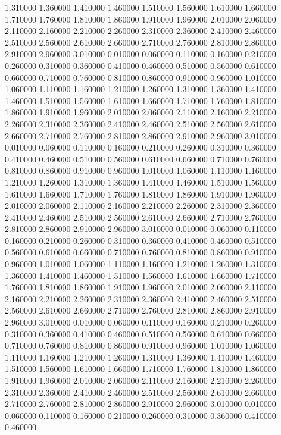 1.310000
1.360000
1.410000
1.460000
1.510000
1.560000
1.610000
1.660000
1.710000
1.760000
1.810000
1.860000
1.910000
1.960000
2.010000
2.060000
2.110000
2.160000
2.210000
2.260000
2.310000
2.360000
2.410000
2.460000
2.510000
2.560000
2.610000
2.660000
2.710000
2.760000
2.810000
2.860000
2.910000
2.960000
3.010000
0.010000
0.060000
0.110000
0.160000
0.210000
0.260000
0.310000
0.360000
0.410000
0.460000
0.510000
0.560000
0.610000
0.660000
0.710000
0.760000
0.810000
0.860000
0.910000
0.960000
1.010000
1.060000
1.110000
1.160000
1.210000
1.260000
1.310000
1.360000
1.410000
1.460000
1.510000
1.560000
1.610000
1.660000
1.710000
1.760000
1.810000
1.860000
1.910000
1.960000
2.010000
2.060000
2.110000
2.160000
2.210000
2.260000
2.310000
2.360000
2.410000
2.460000
2.510000
2.560000
2.610000
2.660000
2.710000
2.760000
2.810000
2.860000
2.910000
2.960000
3.010000
0.010000
0.060000
0.110000
0.160000
0.210000
0.260000
0.310000
0.360000
0.410000
0.460000
0.510000
0.560000
0.610000
0.660000
0.710000
0.760000
0.810000
0.860000
0.910000
0.960000
1.010000
1.060000
1.110000
1.160000
1.210000
1.260000
1.310000
1.360000
1.410000
1.460000
1.510000
1.560000
1.610000
1.660000
1.710000
1.760000
1.810000
1.860000
1.910000
1.960000
2.010000
2.060000
2.110000
2.160000
2.210000
2.260000
2.310000
2.360000
2.410000
2.460000
2.510000
2.560000
2.610000
2.660000
2.710000
2.760000
2.810000
2.860000
2.910000
2.960000
3.010000
0.010000
0.060000
0.110000
0.160000
0.210000
0.260000
0.310000
0.360000
0.410000
0.460000
0.510000
0.560000
0.610000
0.660000
0.710000
0.760000
0.810000
0.860000
0.910000
0.960000
1.010000
1.060000
1.110000
1.160000
1.210000
1.260000
1.310000
1.360000
1.410000
1.460000
1.510000
1.560000
1.610000
1.660000
1.710000
1.760000
1.810000
1.860000
1.910000
1.960000
2.010000
2.060000
2.110000
2.160000
2.210000
2.260000
2.310000
2.360000
2.410000
2.460000
2.510000
2.560000
2.610000
2.660000
2.710000
2.760000
2.810000
2.860000
2.910000
2.960000
3.010000
0.010000
0.060000
0.110000
0.160000
0.210000
0.260000
0.310000
0.360000
0.410000
0.460000
0.510000
0.560000
0.610000
0.660000
0.710000
0.760000
0.810000
0.860000
0.910000
0.960000
1.010000
1.060000
1.110000
1.160000
1.210000
1.260000
1.310000
1.360000
1.410000
1.460000
1.510000
1.560000
1.610000
1.660000
1.710000
1.760000
1.810000
1.860000
1.910000
1.960000
2.010000
2.060000
2.110000
2.160000
2.210000
2.260000
2.310000
2.360000
2.410000
2.460000
2.510000
2.560000
2.610000
2.660000
2.710000
2.760000
2.810000
2.860000
2.910000
2.960000
3.010000
0.010000
0.060000
0.110000
0.160000
0.210000
0.260000
0.310000
0.360000
0.410000
0.460000

